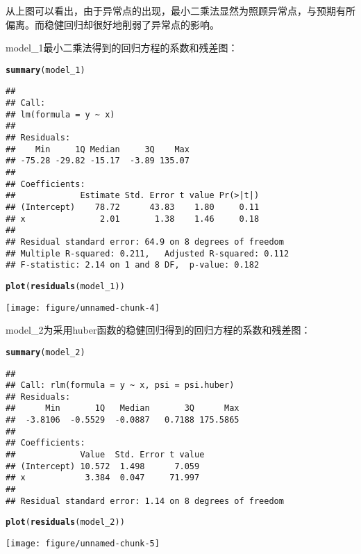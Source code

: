 \documentclass[english]{article}\usepackage[]{graphicx}\usepackage[]{color}
\makeatletter
\def\maxwidth{ %
  \ifdim\Gin@nat@width>\linewidth
    \linewidth
  \else
    \Gin@nat@width
  \fi
}
\newcommand{\hlkwd}[1]{\textcolor[rgb]{0.737,0.353,0.396}{\textbf{#1}}}%
\newenvironment{kframe}{%
 \def\at@end@of@kframe{}%
 \ifinner\ifhmode%
  \def\at@end@of@kframe{\end{minipage}}%
  \begin{minipage}{\columnwidth}%
 \fi\fi%
 \def\FrameCommand##1{\hskip\@totalleftmargin \hskip-\fboxsep
 \colorbox{shadecolor}{##1}\hskip-\fboxsep
     \hskip-\linewidth \hskip-\@totalleftmargin \hskip\columnwidth}%
 \MakeFramed {\advance\hsize-\width
   \@totalleftmargin\z@ \linewidth\hsize
   \@setminipage}}%
 {\par\unskip\endMakeFramed%
 \at@end@of@kframe}
\newenvironment{knitrout}{}{} %
\makeatother
\begin{document}
从上图可以看出，由于异常点的出现，最小二乘法显然为照顾异常点，与预期有所偏离。而稳健回归却很好地削弱了异常点的影响。

model\_1最小二乘法得到的回归方程的系数和残差图：

\begin{knitrout}
\color{fgcolor}\begin{kframe}
\begin{alltt}
\hlkwd{summary}(model_1)
\end{alltt}
\begin{verbatim}
## 
## Call:
## lm(formula = y ~ x)
## 
## Residuals:
##    Min     1Q Median     3Q    Max 
## -75.28 -29.82 -15.17  -3.89 135.07 
## 
## Coefficients:
##             Estimate Std. Error t value Pr(>|t|)
## (Intercept)    78.72      43.83    1.80     0.11
## x               2.01       1.38    1.46     0.18
## 
## Residual standard error: 64.9 on 8 degrees of freedom
## Multiple R-squared: 0.211,	Adjusted R-squared: 0.112 
## F-statistic: 2.14 on 1 and 8 DF,  p-value: 0.182
\end{verbatim}
\begin{alltt}
\hlkwd{plot}(\hlkwd{residuals}(model_1))
\end{alltt}
\end{kframe}
\texttt{[image: figure/unnamed-chunk-4]} 

\end{knitrout}


model\_2为采用huber函数的稳健回归得到的回归方程的系数和残差图：

\begin{knitrout}
\color{fgcolor}\begin{kframe}
\begin{alltt}
\hlkwd{summary}(model_2)
\end{alltt}
\begin{verbatim}
## 
## Call: rlm(formula = y ~ x, psi = psi.huber)
## Residuals:
##      Min       1Q   Median       3Q      Max 
##  -3.8106  -0.5529  -0.0887   0.7188 175.5865 
## 
## Coefficients:
##             Value  Std. Error t value
## (Intercept) 10.572  1.498      7.059 
## x            3.384  0.047     71.997 
## 
## Residual standard error: 1.14 on 8 degrees of freedom
\end{verbatim}
\begin{alltt}
\hlkwd{plot}(\hlkwd{residuals}(model_2))
\end{alltt}
\end{kframe}
\texttt{[image: figure/unnamed-chunk-5]} 

\end{knitrout}
\end{document}
